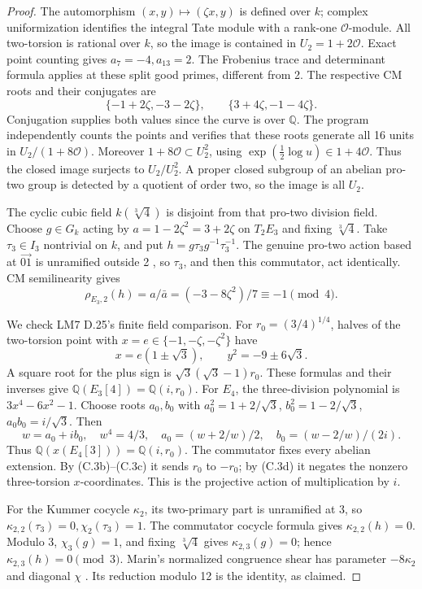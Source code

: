 \begin{proof}
The automorphism \((x,y)\mapsto(\zeta x,y)\) is defined over \(k\);
complex uniformization identifies the integral Tate module with
a rank-one \(\mathcal O\)-module. All two-torsion is rational over
\(k\), so the image is contained in \(U_2=1+2\mathcal O\).
Exact point counting gives \(a_7=-4,a_{13}=2\).
The Frobenius trace and determinant formula
\citep[V.7.5 and its preceding determinant formula]{cMilne2021}
applies at these split good primes, different from 2.
The respective CM roots and their conjugates are
\[
 \{-1+2\zeta,-3-2\zeta\},\qquad
 \{3+4\zeta,-1-4\zeta\}.
 \tag{C.3a}
\]
Conjugation supplies both values since the curve is over \(\mathbb Q\).
The program  independently counts
the points and verifies that these roots generate all 16 units in
\(U_2/(1+8\mathcal O)\). Moreover
\(1+8\mathcal O\subset U_2^2\), using
\(\exp(\tfrac12\log u)\in1+4\mathcal O\).
Thus the closed image surjects to \(U_2/U_2^2\).
A proper closed subgroup of an abelian pro-two group is detected
by a quotient of order two, so the image is all \(U_2\).

The cyclic cubic field \(k(\sqrt[3]4)\) is disjoint from that
pro-two division field. Choose \(g\in G_k\) acting by
\(a=1-2\zeta^2=3+2\zeta\) on \(T_2E_3\) and fixing \(\sqrt[3]4\).
Take \(\tau_3\in I_3\) nontrivial on \(k\), and put
\(h=g\tau_3g^{-1}\tau_3^{-1}\).
The genuine pro-two action based at \(\overrightarrow{01}\) is
unramified outside 2 \citep[\S8.5]{cHainMatsumoto2003}, so
\(\tau_3\), and then this commutator, act identically.
CM semilinearity gives
\[
 \rho_{E_3,2}(h)=a/\bar a=(-3-8\zeta^2)/7\equiv-1\pmod4.
 \tag{C.3b}
\]

We check LM7 D.25's finite field comparison.
For \(r_0=(3/4)^{1/4}\), halves of the two-torsion point
with \(x=e\in\{-1,-\zeta,-\zeta^2\}\) have
\[
 x=e(1\pm\sqrt3),\qquad y^2=-9\pm6\sqrt3.
 \tag{C.3c}
\]
A square root for the plus sign is
\(\sqrt3(\sqrt3-1)r_0\).
These formulas and their inverses give
\(\mathbb Q(E_3[4])=\mathbb Q(i,r_0)\).
For \(E_4\), the three-division polynomial is
\(3x^4-6x^2-1\).
Choose roots \(a_0,b_0\) with
\(a_0^2=1+2/\sqrt3\), \(b_0^2=1-2/\sqrt3\),
\(a_0b_0=i/\sqrt3\).
Then
\[
 w=a_0+ib_0,\quad w^4=4/3,\quad
 a_0=(w+2/w)/2,\quad b_0=(w-2/w)/(2i).
 \tag{C.3d}
\]
Thus \(\mathbb Q(x(E_4[3]))=\mathbb Q(i,r_0)\).
The commutator fixes every abelian extension.
By (C.3b)--(C.3c) it sends \(r_0\) to \(-r_0\); by
(C.3d) it negates the nonzero three-torsion \(x\)-coordinates.
This is the projective action of multiplication by \(i\).

For the Kummer cocycle \(\kappa_2\), its two-primary part
is unramified at 3, so
\(\kappa_{2,2}(\tau_3)=0,\chi_2(\tau_3)=1\).
The commutator cocycle formula gives \(\kappa_{2,2}(h)=0\).
Modulo 3, \(\chi_3(g)=1\), and fixing \(\sqrt[3]4\) gives
\(\kappa_{2,3}(g)=0\); hence \(\kappa_{2,3}(h)=0\pmod3\).
Marin's normalized congruence shear has parameter
\(-8\kappa_2\) and diagonal \(\chi\)
\citep[\S4, Lemmas 4.1--4.3 and the arithmetic specialization]{cMarin2008}.
Its reduction modulo 12 is the identity, as claimed.
\end{proof}

